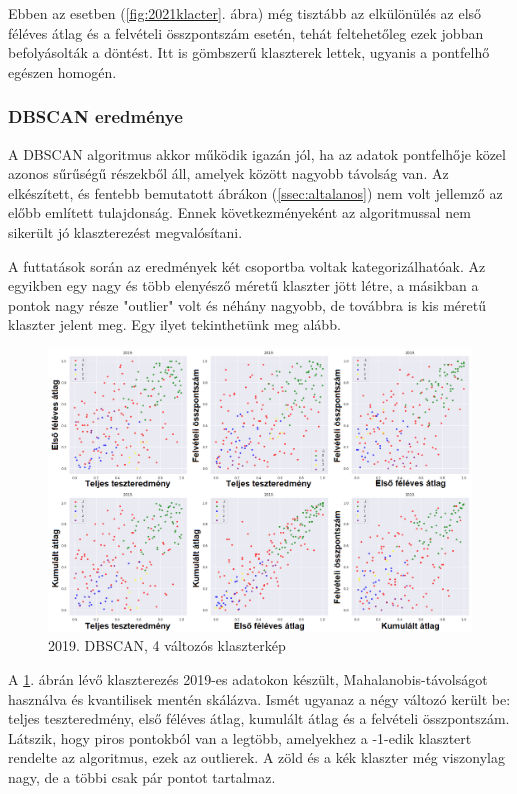 \documentclass[12pt]{article}
\begin{document}
Ebben az esetben (\ref{fig:2021klacter}. ábra) még tisztább az elkülönülés az első féléves átlag és a felvételi összpontszám esetén, tehát feltehetőleg ezek jobban befolyásolták a döntést. Itt is gömbszerű klaszterek lettek, ugyanis a pontfelhő egészen homogén.

\subsubsection{DBSCAN eredménye}

A DBSCAN algoritmus akkor működik igazán jól, ha az adatok pontfelhője közel azonos sűrűségű részekből áll, amelyek között nagyobb távolság van. Az elkészített, és fentebb bemutatott ábrákon (\ref{ssec:altalanos}) nem volt jellemző az előbb említett tulajdonság. Ennek következményeként az algoritmussal nem sikerült jó klaszterezést megvalósítani.

A futtatások során az eredmények két csoportba voltak kategorizálhatóak. Az egyikben egy nagy és több elenyésző méretű klaszter jött létre, a másikban a pontok nagy része "outlier" volt és néhány nagyobb, de továbbra is kis méretű klaszter jelent meg. Egy ilyet tekinthetünk meg alább.

\begin{figure}[H]
\centering
\includegraphics[width = \textwidth]{kepek/dbscan2.png}
\caption{2019. DBSCAN, 4 változós klaszterkép}
\label{fig:dbscan2}
\end{figure}

A \ref{fig:dbscan2}. ábrán lévő klaszterezés 2019-es adatokon készült, Mahalanobis-távolságot használva és kvantilisek mentén skálázva. Ismét ugyanaz a négy változó került be: teljes teszteredmény, első féléves átlag, kumulált átlag és a felvételi összpontszám. Látszik, hogy piros pontokból van a legtöbb, amelyekhez a -1-edik klasztert rendelte az algoritmus, ezek az outlierek. A zöld és a kék klaszter még viszonylag nagy, de a többi csak pár pontot tartalmaz.
\end{document}
